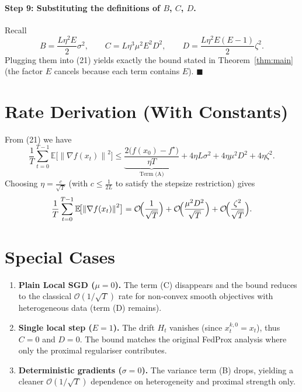 \documentclass{article}
\newcommand{\E}{\mathbb{E}}
\newcommand{\norm}[1]{\left\|#1\right\|}
\begin{document}
\paragraph{Step 9: Substituting the definitions of $B$, $C$, $D$.}
Recall
\[
B = \frac{L\eta^2E}{2}\sigma^2,\qquad
C = L\eta^3\mu^2E^2D^2,\qquad
D = \frac{L\eta^2E(E-1)}{2}\zeta^2 .
\]
Plugging them into (21) yields exactly the bound stated in Theorem~\ref{thm:main}
(the factor $E$ cancels because each term contains $E$).  \hfill $\blacksquare$

\section*{Rate Derivation (With Constants)}
From (21) we have
\[
\frac1T\sum_{t=0}^{T-1}\E\!\bigl[\norm{\nabla f(x_t)}^2\bigr]
 \le
 \underbrace{\frac{2\bigl(f(x_0)-f^\star\bigr)}{\eta T}}_{\text{Term (A)}}
 +4\eta L\sigma^2
 +4\eta\mu^2 D^2
 +4\eta\zeta^2 .
\]
Choosing $\eta = \frac{c}{\sqrt{T}}$ (with $c\le \frac{1}{2L}$ to satisfy the
stepsize restriction) gives
\[
\frac1T\sum_{t=0}^{T-1}\E\!\bigl[\norm{\nabla f(x_t)}^2\bigr]
 = \mathcal{O}\!\Bigl(\frac{1}{\sqrt{T}}\Bigr)
   +\mathcal{O}\!\Bigl(\frac{\mu^2 D^2}{\sqrt{T}}\Bigr)
   +\mathcal{O}\!\Bigl(\frac{\zeta^2}{\sqrt{T}}\Bigr).
\]

\section*{Special Cases}
\begin{enumerate}
\item \textbf{Plain Local SGD ($\mu=0$).}  The term (C) disappears and the bound
      reduces to the classical $\mathcal{O}(1/\sqrt{T})$ rate for non‑convex smooth
      objectives with heterogeneous data (term (D) remains).

\item \textbf{Single local step ($E=1$).}  The drift $H_t$ vanishes (since
      $x_{t}^{k,0}=x_t$), thus $C=0$ and $D=0$.  The bound matches the original
      FedProx analysis where only the proximal regulariser contributes.

\item \textbf{Deterministic gradients ($\sigma=0$).}  The variance term (B) drops,
      yielding a cleaner $\mathcal{O}(1/\sqrt{T})$ dependence on heterogeneity and
      proximal strength only.
\end{enumerate}
\end{document}
